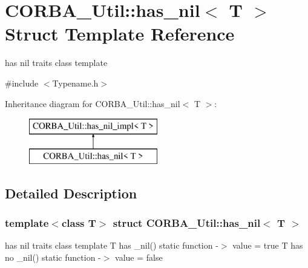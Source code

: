 \section{CORBA\_\-Util::has\_\-nil$<$ T $>$ Struct Template Reference}
\label{structCORBA__Util_1_1has__nil}


has nil traits class template  




{\ttfamily \#include $<$Typename.h$>$}

Inheritance diagram for CORBA\_\-Util::has\_\-nil$<$ T $>$:\begin{figure}[H]
\begin{center}
\leavevmode
\includegraphics[height=2cm]{structCORBA__Util_1_1has__nil}
\end{center}
\end{figure}


\subsection{Detailed Description}
\subsubsection*{template$<$class T$>$ struct CORBA\_\-Util::has\_\-nil$<$ T $>$}

has nil traits class template T has \_\-nil() static function -\/$>$ value = true T has no \_\-nil() static function -\/$>$ value = false 